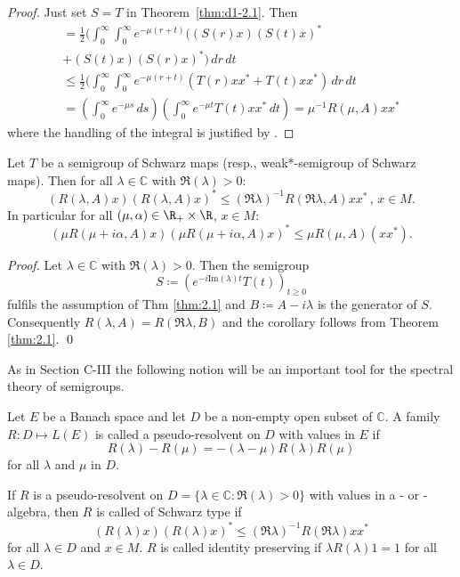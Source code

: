 \begin{proof}
Just set $ S = T $ in Theorem~\ref{thm:d1-2.1}. Then
\begin{multline*}
= \frac{1}{2}(\int_{0}^\infty \int_{0}^\infty e^{-\mu(r+t)} ((S(r)x)(S(t)x)^{*} \\
+ (S(t)x)(S(r)x)^{*}) \, dr \, dt \\
\leq \frac{1}{2}(\int_{0}^\infty \int_{0}^\infty e^{-\mu(r+t)} (T(r)xx^{*} + T(t)xx^{*}) \, dr \, dt \\
= (\int_{0}^\infty e^{-\mu s} \, ds)(\int_{0}^\infty e^{-\mu t}T(t)xx^{*} \, dt) = \mu^{-1}R(\mu,A)xx^{*}
\end{multline*}
where the handling of the integral is justified by \cite[§8, n° 4, Proposition 9]{bourbaki:1955}.
\end{proof}


\begin{corollary}\label{cor:d1-2.3}
Let $ T $ be a semigroup of Schwarz maps (resp., weak*-semigroup of Schwarz maps).
Then for all $ \lambda \in \mathbb{C} $ with $ \Re(\lambda) > 0 $:
\[
(R(\lambda,A)x)(R(\lambda,A)x)^{*} \leq (\Re\lambda)^{-1} R(\Re\lambda,A)xx^{*} \, , \, x \in M .
\]
In particular for all $ (\mu,\alpha) \in \R_{+} \times \R $, $ x \in M $:
\[
(\mu R(\mu+i\alpha,A)x)(\mu R(\mu+i\alpha,A)x)^{*} \leq \mu R(\mu,A)(xx^{*}).
\]
\end{corollary}

\begin{proof}
Let $ \lambda \in \mathbb{C} $ with $ \Re(\lambda) > 0 $.
Then the semigroup
\[
S \coloneqq (e^{-i\text{Im}(\lambda)t}T(t))_{t\geq0}
\]
fulfils the assumption of Thm \ref{thm:2.1} and $ B \coloneqq A - i\lambda $ is the generator of $ S $.
Consequently $ R(\lambda,A) = R(\Re\lambda,B) $ and the corollary follows from Theorem \ref{thm:2.1}.
\qed
\end{proof}

As in Section C-III the following notion will be an important tool for the spectral theory of semigroups.

\begin{definition}\label{def:d1-2.3}
Let $E$ be a Banach space and let $D$ be a non-empty open subset of $\mathbb{C}$.
A family $ R: D \mapsto L(E) $ is called a pseudo-resolvent on $ D $ with values in $ E $ if
\[
R(\lambda) - R(\mu) = -(\lambda - \mu)R(\lambda)R(\mu)
\]
for all $ \lambda $ and $ \mu $ in $ D $.
\end{definition}
\newpage
If $ R $ is a pseudo-resolvent on $ D = \{\lambda \in \mathbb{C} \colon \Re(\lambda) > 0\} $ with values in a \CA- or \WA-algebra, then $ R $ is called of Schwarz type if
\[
(R(\lambda)x)(R(\lambda)x)^{*} \leq (\Re\lambda)^{-1} R(\Re\lambda)xx^{*}
\]
for all $ \lambda \in D $ and $ x \in M $.
$ R $ is called identity preserving if $ \lambda R(\lambda)1 = 1 $ for all $ \lambda \in D $.

